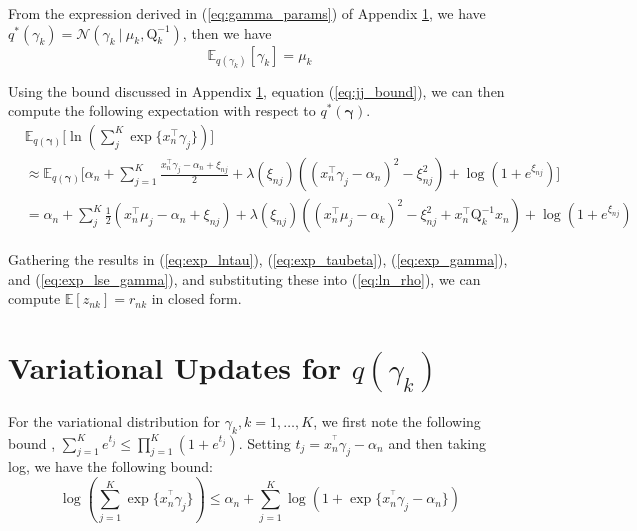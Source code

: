 \documentclass[twoside,11pt]{article}
\newcommand{\tr}{\intercal}
\newcommand\given[1][]{\:#1\vert\:}
\newcommand{\E}{\mathbb{E}}
\begin{document}
From the expression derived in (\ref{eq:gamma_params}) of Appendix \ref{app:gamma}, we have $q^{*}(\gamma_k) = \mathcal{N}(\gamma_k \given \mu_k, \mathrm{Q}_k^{-1})$, then we have
\begin{equation} \label{eq:exp_gamma}
	\E_{q(\gamma_k)}[\gamma_k] = \mu_k
\end{equation}

Using the bound discussed in Appendix \ref{app:gamma}, equation (\ref{eq:jj_bound}), we can then compute the following expectation with respect to $q^{*}(\boldsymbol\gamma)$.
\begin{equation} \label{eq:exp_lse_gamma}
\begin{split}
	& \E_{q(\boldsymbol\gamma)} \Bigg[ \ln \left( \sum_{j}^K \exp \{ x_n^{\tr} \gamma_j \}\right) \Bigg] \\
	& \approx \E_{q(\boldsymbol\gamma)} \Bigg[ \alpha_n + \sum_{j = 1}^K \frac{x_n^{\intercal} \gamma_j - \alpha_n + \xi_{nj}}{2} + \lambda(\xi_{nj}) \left( (x_n^{\intercal} \gamma_j - \alpha_n)^2 - \xi_{nj}^2\right) + \log \left( 1 + e^{\xi_{nj}}\right) \Bigg] \\
	& = \alpha_n + \sum_{j}^K \frac{1}{2}\left(x_n^{\tr}\mu_j - \alpha_n + \xi_{nj}\right) + \lambda(\xi_{nj}) \left( (x_n^{\tr} \mu_j - \alpha_k)^2 - \xi_{nj}^2 + x_n^{\tr} \mathrm{Q}_k^{-1} x_n \right) + \log( 1 + e^{\xi_{nj}})
\end{split}
\end{equation}

Gathering the results in (\ref{eq:exp_lntau}), (\ref{eq:exp_taubeta}), (\ref{eq:exp_gamma}), and (\ref{eq:exp_lse_gamma}), and substituting these into (\ref{eq:ln_rho}), we can compute $\E[z_{nk}] = r_{nk}$ in closed form. 



\section{Variational Updates for $q(\gamma_k)$} \label{app:gamma}  



For the variational distribution for $\gamma_k, k = 1, \ldots, K$, we first note the following bound \parencite{bouchard:07}, $\sum_{j = 1}^{K} e^{t_j} \leq \prod_{j = 1}^K (1 + e^{t_j})$. Setting $t_j = x_n^{^\intercal} \gamma_j - \alpha_{n}$ and then taking log, we have the following bound:
\begin{equation} \label{eq:log-sum-exp}
	\log \left( \sum_{j = 1}^K \exp\{ x_n^{^\intercal} \gamma_j \}\right) \leq \alpha_n + \sum_{j=1}^K \log \left( 1 + \exp \{ x_n^{^\intercal} \gamma_j - \alpha_n \}\right)
\end{equation}
\end{document}

